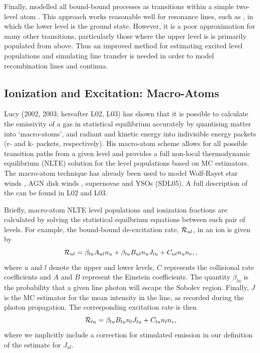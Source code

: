 \documentclass[preprint, a4paper, 11pt]{aastex}
\begin{document}
Finally, \py modelled all bound-bound processes as transitions
within a simple two-level atom \cite[see e.g.][]{mihalas}. This
approach works reasonable well for resonance  
lines, such as \civfull, in which the lower level is the ground state.  
However, it is a poor approximation for many other
transitions, particularly those where the upper level is 
is primarily populated from above. Thus an improved method for
estimating excited level populations and simulating line transfer is
needed in order to model recombination lines and continua.

\subsection{Ionization and Excitation: Macro-Atoms}

Lucy (2002, 2003\nocite{lucy2002, lucy2003}; hereafter L02, L03) 
has shown that it is possible to calculate the emissivity of a gas in
statistical equilibrium accurately by quantising matter into
`macro-atoms', and radiant and kinetic energy into indivisible energy
packets (r- and k- packets, respectively). His macro-atom scheme
allows for all possible transition paths from a given level and
provides a full non-local thermodynamic equilibrium (NLTE) solution
for the level populations based on MC estimators. The macro-atom
technique has already been used to model Wolf-Rayet star
winds \citep{sim2004}, AGN disk winds \citep{simlong2008, tatum2012},
supernovae \citep{kasen2006, kerzendorfsim} and YSOs (SDL05). A full 
description of the can be found in L02 and L03. 

Briefly, macro-atom NLTE level populations and ionization fractions
are calculated by solving the statistical equilbrium equations between
each pair of levels. For example, the bound-bound de-excitation rate,
${\cal R}_{ul}$, in an ion is given by  
\begin{equation}
{\cal R}_{ul} = \beta_{lu} A_{ul} n_u + \beta_{lu} B_{ul} n_u J_{lu} +
C_{ul} n_u n_e,\label{eq:nlte_rul},
\end{equation}
where $u$ and $l$ denote the upper and lower levels, $C$ represents the
collisional rate coefficients and $A$ and $B$ represent the Einstein
coefficients. The quantity $\beta_{lu}$ is the probability that a
given line photon will escape the Sobolev region. Finally, $J$ is the
MC estimator for the mean intensity in the line, as recorded during
the photon propagation. The corresponding excitation rate is then 
\begin{equation}
{\cal R}_{lu} = \beta_{lu} B_{lu} n_l J_{lu} + C_{lu} n_l n_e,
\end{equation}
where we implicitly include a correction for stimulated emission in
our definition of the estimate for $J_{ul}$. 
\end{document}
